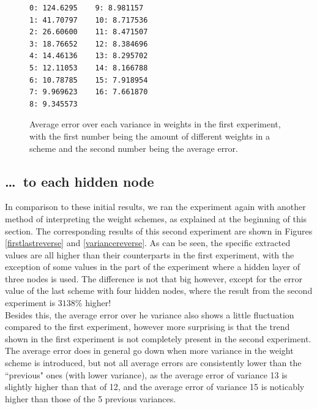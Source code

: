 \documentclass[a4paper, 10pt, notitlepage, twocolumn]{article}
\begin{document}
  \begin{figure}[h!]
  	\begin{verbatim}
0: 124.6295    9: 8.981157
1: 41.70797    10: 8.717536
2: 26.60600    11: 8.471507
3: 18.76652    12: 8.384696
4: 14.46136    13: 8.295702
5: 12.11053    14: 8.166788
6: 10.78785    15: 7.918954
7: 9.969623    16: 7.661870
8: 9.345573
  	\end{verbatim}
  	\caption{Average error over each variance in weights in the first experiment, with the first number being the amount of different weights in a scheme and the second number being the average error.}
  	\label{varianceaverage}
  \end{figure}

  \subsection{\ldots~to each hidden node}
  In comparison to these initial results, we ran the experiment again with another method of interpreting the weight schemes, as explained at the beginning of this section. The corresponding results of this second experiment are shown in Figures \ref{firstlastreverse} and \ref{variancereverse}. As can be seen, the specific extracted values are all higher than their counterparts in the first experiment, with the exception of some values in the part of the experiment where a hidden layer of three nodes is used. The difference is not that big however, except for the error value of the last scheme with four hidden nodes, where the result from the second experiment is $3138\%$ higher!\\
  Besides this, the average error over he variance also shows a little fluctuation compared to the first experiment, however more surprising is that the trend shown in the first experiment is not completely present in the second experiment. The average error does in general go down when more variance in the weight scheme is introduced, but not all average errors are consistently lower than the ``previous" ones (with lower variance), as the average error of variance 13 is slightly higher than that of 12, and the average error of variance 15 is noticably higher than those of the 5 previous variances.
  
\end{document}
